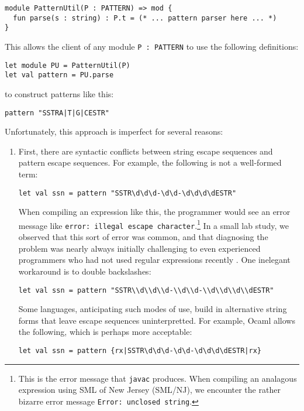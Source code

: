 \begin{lstlisting}[numbers=none]
module PatternUtil(P : PATTERN) => mod {
  fun parse(s : string) : P.t = (* ... pattern parser here ... *)
}
\end{lstlisting}
This allows the client of any module \lstinline{P : PATTERN} to use the following definitions:
\begin{lstlisting}[numbers=none]
let module PU = PatternUtil(P)
let val pattern = PU.parse
\end{lstlisting}
to construct patterns like this:
\begin{lstlisting}[numbers=none]
pattern "SSTRA|T|G|CESTR"
\end{lstlisting}
Unfortunately, this approach is imperfect for several reasons:
\begin{enumerate} 
\item First, there are syntactic conflicts between string escape sequences and pattern escape sequences. For example, the following is not a well-formed term:
\begin{lstlisting}[numbers=none,mathescape=|]
let val ssn = pattern "SSTR\d\d\d-\d\d-\d\d\d\dESTR"
\end{lstlisting}
When compiling an expression like this, the programmer would see an error message like \verb|error: illegal escape character|.\footnote{This is the error message that \texttt{javac} produces. When compiling an analagous expression using SML of New Jersey (SML/NJ), we encounter the rather bizarre error message \texttt{Error: unclosed string}.} In a small lab study, we observed that this sort of error was common, and that diagnosing the problem was nearly always initially challenging to even experienced programmers who had not used regular expressions recently \cite{Omar:2012:ACC:2337223.2337324}. One inelegant workaround is to  double backslashes:
\begin{lstlisting}[numbers=none]
let val ssn = pattern "SSTR\\d\\d\\d-\\d\\d-\\d\\d\\d\\dESTR"
\end{lstlisting}

Some languages, anticipating such modes of use, build in alternative string forms that leave escape sequences uninterpretted. For example, Ocaml allows the following, which is perhaps more acceptable:
\begin{lstlisting}[numbers=none]
let val ssn = pattern {rx|SSTR\d\d\d-\d\d-\d\d\d\dESTR|rx}
\end{lstlisting}


\end{enumerate}
